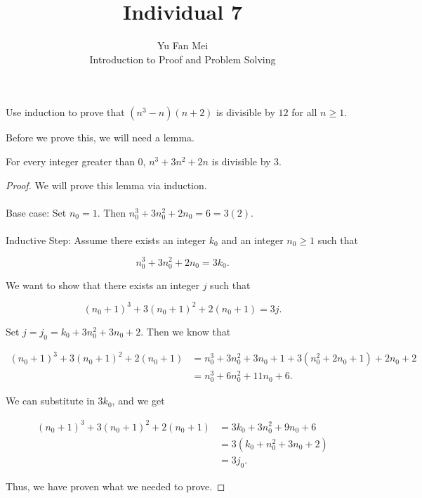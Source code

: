 \documentclass[12pt]{article}
\newenvironment{lemma}[2][Lemma]{\begin{trivlist}
\item[\hskip \labelsep {\bfseries #1}\hskip \labelsep {\bfseries #2.}]}{\end{trivlist}}
\newenvironment{problem}[2][Problem]{\begin{trivlist}
\item[\hskip \labelsep {\bfseries #1}\hskip \labelsep {\bfseries #2.}]}{\end{trivlist}}
\begin{document}

\title{Individual 7}%
\author{Yu Fan Mei\\ %
	Introduction to Proof and Problem Solving} %

\maketitle

\begin{problem}{1}
    Use induction to prove that $(n^3 - n)(n + 2)$ is divisible by $12$ for all $n \geq 1$.
\end{problem}

Before we prove this, we will need a lemma.

\begin{lemma}{1} For every integer greater than 0, $n^3 + 3n^2 + 2n$ is divisible by 3.
\end{lemma}

\begin{proof}
    We will prove this lemma via induction. \\ \\ 
    Base case: Set $n_0 = 1$. Then 
 $n_0^3 + 3n_0^2 + 2n_0 = 6 = 3(2).$ \\ \\
 \noindent
    Inductive Step: Assume there exists an integer $k_0$ and an integer $n_0 \geq 1$ such that

    $$n_0^3 + 3n_0^2 + 2n_0 = 3k_0.$$

    We want to show that there exists an integer $j$ such that

    $$(n_0+1)^3 + 3(n_0+1)^2 + 2(n_0+1) = 3j.$$

    Set $j = j_0 = k_0 + 3n_0^2 + 3n_0 + 2$. Then we know that

    \begin{align*}
        (n_0+1)^3 + 3(n_0+1)^2 + 2(n_0+1) &= n_0^3 + 3n_0^2 + 3n_0 + 1 + 3(n_0^2 + 2n_0 + 1) + 2n_0 + 2\\
        &= n_0^3 + 6n_0^2 + 11n_0 + 6.
    \end{align*}

    We can substitute in $3k_0$, and we get

    \begin{align*}
        (n_0+1)^3 + 3(n_0+1)^2 + 2(n_0+1) &= 3k_0 + 3n_0^2 + 9n_0 + 6 \\
        &= 3(k_0 + n_0^2 + 3n_0 + 2) \\
        &= 3j_0.
    \end{align*}

    Thus, we have proven what we needed to prove.
\end{proof}
\end{document}
